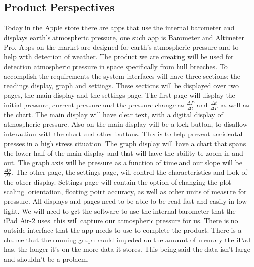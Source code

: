 \documentclass[onecolumn, draftclsnofoot,10pt, compsoc]{IEEEtran}
\begin{document}
\subsection{Product Perspectives}
Today in the Apple store there are apps that use the internal barometer and displays earth's atmospheric pressure, one such app is Barometer and Altimeter Pro.
Apps on the market are designed for earth's atmospheric pressure and to help with detection of weather.
The product we are creating will be used for detection atmospheric pressure in space specifically from hull breaches.
To accomplish the requirements the system interfaces will have three sections: the readings display, graph and settings.
These sections will be displayed over two pages, the main display and the settings page.
The first page will display the initial pressure, current pressure and the pressure change as $\frac{\Delta P}{\Delta t}$ and $\frac{\Delta t}{\Delta P}$ as well as  the chart.
The main display will have clear text, with a digital display of atmospheric pressure.
Also on the main display will be a lock button, to disallow interaction with the chart and other buttons.
This is to help prevent accidental presses in a high stress situation.
The graph display will have a chart that spans the lower half of the main display and that will have the ability to zoom in and out.
The graph axis will be pressure as a function of time and our slope will be $\frac{\Delta p}{\Delta t}$.
The other page, the settings page, will control the characteristics and look of the other display.
Settings page will contain the option of changing the plot scaling, orientation, floating point accuracy, as well as other units of measure for pressure.
 All displays and pages need to be able to be read fast and easily in low light.
We will need to get the software to use the internal barometer that the iPad Air-2 uses, this will capture our atmospheric pressure for us.
There is no outside interface that the app needs to use to complete the product.
There is a chance that the running graph could impeded on the amount of memory the iPad has, the longer it's on the more data it stores.
This being said the data isn't large and shouldn't be a problem.
\end{document}
